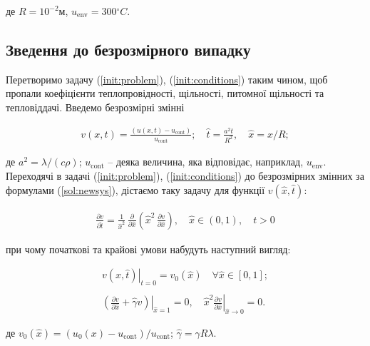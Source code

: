 де \( R = 10^{-2}\text{м}\), \(u_\text{env} = 300{^\circ}C\).

\subsection{Зведення до безрозмірного випадку}
Перетворимо задачу (\ref{init:problem}), (\ref{init:conditions}) таким чином, щоб пропали коефіцієнти теплопровідності, щільності, питомної щільності та тепловіддачі. Введемо безрозмірні змінні

\begin{equation}
\begin{split} \label{sol:newsys}
v(x, t) = \frac{(u(x, t) - u_\text{cont})}{u_\text{cont}}; \quad \hat{t} = \frac{a^2t}{R^2}, \quad \hat{x} = x/R;
\end{split}
\end{equation}

де \( a^2 = \lambda/(c\rho)\); \(u_\text{cont}\) -- деяка величина, яка відповідає, наприклад, \( u_{\text{env}}\). Переходячі в задачі (\ref{init:problem}), (\ref{init:conditions}) до безрозмірних змінних за формулами (\ref{sol:newsys}), дістаємо таку задачу для функції \( v\left(\hat{x}, \hat{t}\right)\):

\begin{equation}
\begin{split} \label{nomes:problem}
\frac{\partial{v}}{\partial{\hat{t}}} = \frac{1}{\hat{x}^2} \, \frac{\partial}{\partial \hat{x}} \left( \hat{x}^2 \, \frac{\partial v}{\partial \hat{x}} \right), \quad \hat{x} \in (0, 1), \quad t > 0
\end{split}
\end{equation}

при чому початкові та крайові умови набудуть наступний вигляд:

\begin{equation}
\begin{multlined} \label{nomes:conditions}
\left.v(\hat{x}, \hat{t})\right|_{t = 0} = v_0(\hat{x}) \quad \forall \hat{x} \in [0, 1];\\ \\
\left.\left( \frac{\partial v}{\partial \hat{x}} + \hat{\gamma}v\right)\right|_{\hat{x} = 1} = 0, \quad \left.\hat{x}^2\frac{\partial{v}}{\partial{\hat{x}}}\right|_{\hat{x} \rightarrow 0} = 0.
\end{multlined}
\end{equation}

де \( v_0(\hat{x}) = (u_0(x) - u_\text{cont})/u_\text{cont}\); \(\hat{\gamma} = \gamma R\lambda\).

